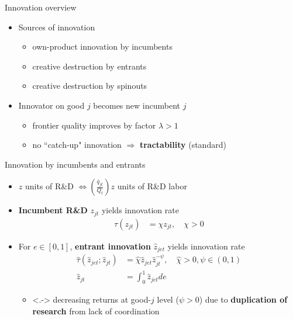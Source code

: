 \documentclass[english,usenames,dvipsnames]{beamer}
\begin{document}
\begin{frame}{Innovation overview}
	\begin{itemize}
		\item<+-> Sources of innovation
		\begin{itemize}
			\item own-product innovation by incumbents
			\item creative destruction by entrants 
			\item creative destruction by spinouts
		\end{itemize}
		\medskip
		\item<+-> Innovator on good $j$ becomes new incumbent $j$
		\begin{itemize}
			\item<+-> frontier quality improves by factor $\lambda > 1$
			\item<+-> no ``catch-up" innovation $\Rightarrow$ \alert{\textbf{tractability}} (standard)
		\end{itemize}
	\end{itemize}
\end{frame}

\begin{frame}{Innovation by incumbents and entrants}
	\begin{itemize}
		\item<+-> $z$ units of R\&D $\Leftrightarrow (\frac{\bar{q}_{jt}}{Q_t})z$ units of R\&D labor
		\bigskip
		\item<+-> \alert{\textbf{Incumbent R\&D}} $z_{jt}$ yields innovation rate 
		\begin{align*}
		\tau(z_{jt}) &= \chi z_{jt}, \quad \chi > 0
		\end{align*}
		\item<+-> For $e \in [0,1]$, \alert{\textbf{entrant innovation}} $\hat{z}_{jet}$ yields innovation rate
		\begin{align*}
		\hat{\tau}(\hat{z}_{jet};\hat{z}_{jt}) &= \hat{\chi} \hat{z}_{jet} \hat{z}_{jt}^{-\psi}, \quad \hat{\chi} > 0, \psi \in (0,1) \\
		\hat{z}_{jt} &= \int_0^1 \hat{z}_{jet} de
		\end{align*}
		\begin{itemize}
			\item<.-> decreasing returns at good-$j$ level ($\psi > 0$) due to \textbf{\alert{duplication of research}} from lack of coordination
		\end{itemize}
	\end{itemize}
\end{frame}
\end{document}
